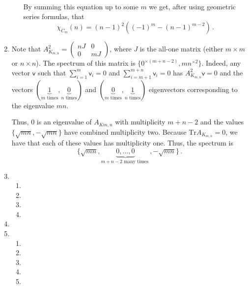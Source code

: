 \documentclass[kulak]{tplt}
\theoremstyle{definition}
\newcommand{\vv}{\mathsf{v}}
\newcommand{\Tr}{\mathrm{Tr}}
\begin{document}
\begin{enumerate}
\begin{enumerate}
By summing this equation up to some $m$ we get, after using geometric series formulas, that
$$\chi_{C_m}(n) = (n-1)^2\left( (-1)^m - (n-1)^{m-2}\right) \, . $$

\end{enumerate}


\item 
Note that $A_{K_{m, n}}^2 = \begin{pmatrix}
n J & 0 \\ 0 & mJ
\end{pmatrix}$, where $J$ is the all-one matrix (either $m\times m$ or $n\times n$).
The spectrum of this matrix is $\{ 0 ^{\times (m+n-2) }, mn^{\times 2}\}$.
Indeed, any vector $\vv $ such that $\sum_{i=1}^m \vv_i = 0$ and $\sum_{i=m+1}^{m+n} \vv_i = 0$ has $A_{K_{m, n}}^2\vv =0 $ and the vectors $(\underbrace{1}_{m \text{ times}}, \underbrace{0}_{n \text{ times}})$ and  $ (\underbrace{0}_{m \text{ times}}, \underbrace{1}_{n \text{ times}})$ eigenvectors corresponding to the eigenvalue $mn$.

Thus, $0$ is an eigenvalue of $A_{K{m, n}}$ with multiplicity $m+n-2$ and the values $\{ \sqrt{mn}, -\sqrt{mn}\}$ have combined multiplicity two.
Because $\Tr A_{K_{m, n}} =0 $, we have that each of these values has multiplicity one.
Thus, the spectrum is 
$$ \{ \sqrt{mn}, \underbrace{0, 
\ldots, 0}_{m+n-2 \text{ many times }}, -\sqrt{mn} \} \, . $$

\item 
\begin{enumerate}
\item 

\item 

\item 

\item 

\end{enumerate}


\item 

\item 
\begin{enumerate}
\item 

\item 

\item 

\item

\item 
\end{enumerate}

\end{enumerate}
\end{document}
